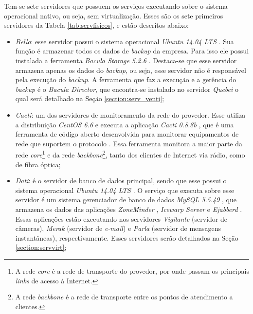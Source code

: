Tem-se sete servidores que possuem os serviços executando sobre o sistema operacional nativo, ou seja, sem virtualização. 
Esses são os sete primeiros servidores da Tabela \ref{tab:servfisicos}, e estão descritos abaixo:
\begin{itemize}
 \item \textit{Bello}: esse servidor possui o sistema operacional \textit{Ubuntu 14.04 \ac{LTS}} \cite{ubuntu}. Sua função é armazenar todos os 
 dados de \textit{backup} da empresa. Para isso ele possui instalada a ferramenta \textit{Bacula Storage 5.2.6} \cite{bacula}. Destaca-se que esse 
 servidor armazena apenas os dados do \textit{backup}, ou seja, esse servidor não é responsável pela execução do \textit{backup}. A ferramenta que 
 faz a execução e a gerência do \textit{backup} é o \textit{Bacula Director}, que encontra-se instalado no servidor \textit{Quebei} o qual será 
 detalhado na Seção \ref{section:serv_venti};
 
 \item \textit{Cacti}: um dos servidores de monitoramento da rede do provedor. Esse utiliza a distribuição \textit{CentOS 6.6} \cite{centos} e 
 executa a aplicação \textit{Cacti 0.8.8b} \cite{cacti}, que é uma ferramenta de código aberto desenvolvida para monitorar equipamentos de rede 
 que suportem o protocolo  \cite{kurose2006}. Essa ferramenta monitora a maior parte da rede 
 \textit{core}\footnote[1]{A rede \textit{core} é a rede de transporte do provedor, por onde passam os principais \textit{links} de acesso à 
 Internet.} e da rede \textit{backbone}\footnote[2]{A rede \textit{backbone} é a rede de transporte entre os pontos de atendimento a clientes.}, 
 tanto dos clientes de Internet via rádio, como de fibra óptica;
 
 \item \textit{Dati}: é o servidor de banco de dados principal, sendo que esse possui o sistema operacional \textit{Ubuntu 14.04 \ac{LTS}} 
 \cite{ubuntu}. O serviço que executa sobre esse servidor é um sistema gerenciador de banco de dados \textit{MySQL 5.5.49} \cite{mysql}, que 
 armazena os dados das aplicações \textit{ZoneMinder} \cite{zoneminder}, \textit{Icewarp Server} \cite{icewarp} e \textit{Ejabberd} \cite{ejabberd}. 
 Essas aplicações estão executando nos servidores \textit{Vigilante} (servidor de câmeras), \textit{Merak} (servidor de \textit{e-mail}) e 
 \textit{Parla} (servidor de mensagens instantâneas), respectivamente. Esses servidores serão detalhados na Seção \ref{section:servvirt};
 

\end{itemize}
